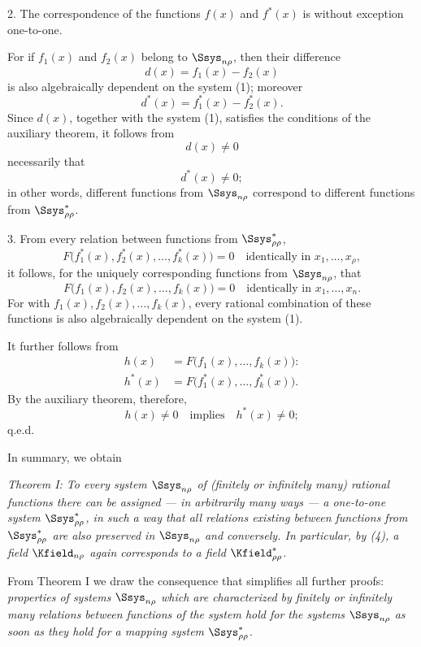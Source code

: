 \documentclass[11pt]{article}
\begin{document}
2. The correspondence of the functions $f(x)$ and $f^*(x)$ is without exception one-to-one.

For if $f_1(x)$ and $f_2(x)$ belong to $\Ssys_{n\rho}$, then their difference
\[
  d(x)=f_1(x)-f_2(x)
\]
is also algebraically dependent on the system (1); moreover
\[
  d^*(x)=f_1^*(x)-f_2^*(x).
\]
Since $d(x)$, together with the system (1), satisfies the conditions of the auxiliary theorem, it follows from
\[
  d(x)\ne0
\]
necessarily that
\[
  d^*(x)\ne0;
\]
in other words, different functions from $\Ssys_{n\rho}$ correspond to different functions from $\Ssys^*_{\rho\rho}$.

3. From every relation between functions from $\Ssys^*_{\rho\rho}$,
\[
  F\bigl(f_1^*(x),f_2^*(x),\ldots,f_k^*(x)\bigr)=0
  \quad\text{identically in }x_1,\ldots,x_\rho,
\]
it follows, for the uniquely corresponding functions from $\Ssys_{n\rho}$, that
\[
  F\bigl(f_1(x),f_2(x),\ldots,f_k(x)\bigr)=0
  \quad\text{identically in }x_1,\ldots,x_n.
\]
For with $f_1(x),f_2(x),\ldots,f_k(x)$, every rational combination of these functions is also algebraically dependent on the system (1).

It further follows from
\begin{equation}
\begin{aligned}
 h(x)&=F\bigl(f_1(x),\ldots,f_k(x)\bigr):\\
 h^*(x)&=F\bigl(f_1^*(x),\ldots,f_k^*(x)\bigr).
\end{aligned}
\tag{4}
\end{equation}
By the auxiliary theorem, therefore,
\[
  h(x)\ne0\quad\text{implies}\quad h^*(x)\ne0;
\]
q.e.d.

In summary, we obtain

\emph{Theorem I: To every system $\Ssys_{n\rho}$ of (finitely or infinitely many) rational functions there can be assigned --- in arbitrarily many ways --- a one-to-one system $\Ssys^*_{\rho\rho}$, in such a way that all relations existing between functions from $\Ssys^*_{\rho\rho}$ are also preserved in $\Ssys_{n\rho}$ and conversely. In particular, by (4), a field $\Kfield_{n\rho}$ again corresponds to a field $\Kfield^*_{\rho\rho}$.}

From Theorem I we draw the consequence that simplifies all further proofs: \emph{properties of systems $\Ssys_{n\rho}$ which are characterized by finitely or infinitely many relations between functions of the system hold for the systems $\Ssys_{n\rho}$ as soon as they hold for a mapping system $\Ssys^*_{\rho\rho}$.}
\end{document}
